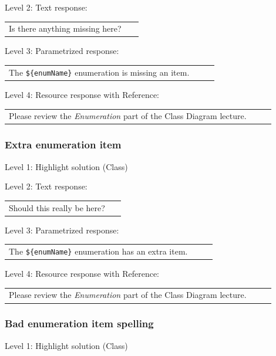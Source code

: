 \noindent Level 2: Text response: \medskip

\begin{tabular}{|p{0.9\linewidth}}
Is there anything missing here?
\end{tabular} \medskip

\noindent Level 3: Parametrized response: \medskip

\begin{tabular}{|p{0.9\linewidth}}
The \verb|${enumName}| enumeration is missing an item.
\end{tabular} \medskip

\noindent Level 4: Resource response with Reference: \medskip

\begin{tabular}{|p{0.9\linewidth}}
Please review the \textit{Enumeration} part of the Class Diagram lecture.
\end{tabular} \medskip


\subsubsection{Extra enumeration item}

\noindent Level 1: Highlight solution (Class) \medskip

\noindent Level 2: Text response: \medskip

\begin{tabular}{|p{0.9\linewidth}}
Should this really be here?
\end{tabular} \medskip

\noindent Level 3: Parametrized response: \medskip

\begin{tabular}{|p{0.9\linewidth}}
The \verb|${enumName}| enumeration has an extra item.
\end{tabular} \medskip

\noindent Level 4: Resource response with Reference: \medskip

\begin{tabular}{|p{0.9\linewidth}}
Please review the \textit{Enumeration} part of the Class Diagram lecture.
\end{tabular} \medskip


\subsubsection{Bad enumeration item spelling}

\noindent Level 1: Highlight solution (Class) \medskip

